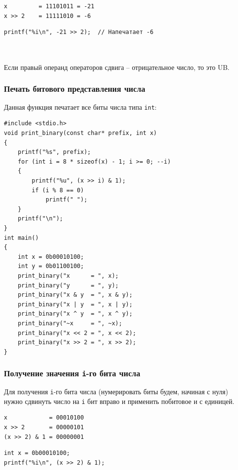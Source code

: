 \documentclass{article}
\begin{document}
\begin{minipage}{0.35\textwidth}
\begin{verbatim}
x         = 11101011 = -21
x >> 2    = 11111010 = -6
\end{verbatim}
\end{minipage}
\hfill
\begin{minipage}{0.55\textwidth}
\begin{lstlisting}
printf("%i\n", -21 >> 2);  // Напечатает -6
\end{lstlisting}
\end{minipage}
\quad\\
\quad\\
Если правый операнд операторов сдвига -- отрицательное число, то это UB.

\subsubsection*{Печать битового представления числа}
Данная функция печатает все биты числа типа \texttt{int}:
\begin{lstlisting}
#include <stdio.h>
void print_binary(const char* prefix, int x)
{
    printf("%s", prefix);
    for (int i = 8 * sizeof(x) - 1; i >= 0; --i)
    {
        printf("%u", (x >> i) & 1);
        if (i % 8 == 0)
            printf(" ");
    }
    printf("\n");
}
int main() 
{
    int x = 0b00010100;
    int y = 0b01100100;
    print_binary("x      = ", x);
    print_binary("y      = ", y);
    print_binary("x & y  = ", x & y);
    print_binary("x | y  = ", x | y);
    print_binary("x ^ y  = ", x ^ y);
    print_binary("~x     = ", ~x);
    print_binary("x << 2 = ", x << 2);
    print_binary("x >> 2 = ", x >> 2);
}
\end{lstlisting}

\subsubsection*{Получение значения \texttt{i}-го бита числа}
Для получения \texttt{i}-го бита числа (нумерировать биты будем, начиная с нуля) нужно сдвинуть число на \texttt{i} бит вправо и применить побитовое и с единицей.

\begin{minipage}{0.35\textwidth}
\begin{lstlisting}
x            = 00010100
x >> 2       = 00000101
(x >> 2) & 1 = 00000001
\end{lstlisting}
\end{minipage}
\hfill
\begin{minipage}{0.55\textwidth}
\begin{lstlisting}
int x = 0b00010100;
printf("%i\n", (x >> 2) & 1);
\end{lstlisting}
\end{minipage}
\end{document}
